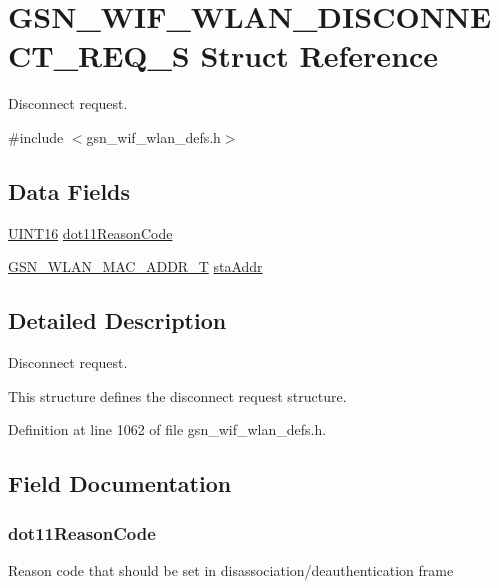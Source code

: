 \hypertarget{a00380}{
\section{GSN\_\-WIF\_\-WLAN\_\-DISCONNECT\_\-REQ\_\-S Struct Reference}
\label{a00380}
}


Disconnect request.  




{\ttfamily \#include $<$gsn\_\-wif\_\-wlan\_\-defs.h$>$}

\subsection*{Data Fields}
\begin{DoxyCompactItemize}
\item 
\hyperlink{a00660_ga09f1a1fb2293e33483cc8d44aefb1eb1}{UINT16} \hyperlink{a00380_a848f94f274f6ba20178b114dad2045d5}{dot11ReasonCode}
\item 
\hyperlink{a00416}{GSN\_\-WLAN\_\-MAC\_\-ADDR\_\-T} \hyperlink{a00380_a3ca54ba7eb6c301c5b6584284a9ccb8b}{staAddr}
\end{DoxyCompactItemize}


\subsection{Detailed Description}
Disconnect request. 

This structure defines the disconnect request structure. 

Definition at line 1062 of file gsn\_\-wif\_\-wlan\_\-defs.h.



\subsection{Field Documentation}
\hypertarget{a00380_a848f94f274f6ba20178b114dad2045d5}{
\subsubsection[{dot11ReasonCode}]{ {\bf dot11ReasonCode}}}
\label{a00380_a848f94f274f6ba20178b114dad2045d5}
Reason code that should be set in disassociation/deauthentication frame 

